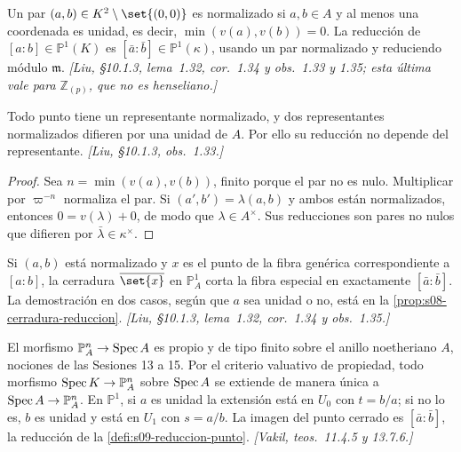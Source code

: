 \begin{defi}
\label{defi:s09-reduccion-punto}
Un par $(a,b)\in K^2\setminus\set{(0,0)}$ es normalizado si $a,b\in A$ y al menos una coordenada es unidad, es decir, $\min(v(a),v(b))=0$. La reducción de $[a:b]\in\mathbb P^1(K)$ es $[\bar a:\bar b]\in\mathbb P^1(\kappa)$, usando un par normalizado y reduciendo módulo $\mathfrak m$. \emph{[Liu, \S10.1.3, lema~1.32, cor.~1.34 y obs.~1.33 y 1.35; esta última vale para $\mathbb Z_{(p)}$, que no es henseliano.]}
\end{defi}

\begin{lema}
\label{lema:s09-reduccion-bien-definida}
Todo punto tiene un representante normalizado, y dos representantes normalizados difieren por una unidad de $A$. Por ello su reducción no depende del representante. \emph{[Liu, \S10.1.3, obs.~1.33.]}
\end{lema}
\begin{proof}
Sea $n=\min(v(a),v(b))$, finito porque el par no es nulo. Multiplicar por $\varpi^{-n}$ normaliza el par. Si $(a',b')=\lambda(a,b)$ y ambos están normalizados, entonces $0=v(\lambda)+0$, de modo que $\lambda\in A^\times$. Sus reducciones son pares no nulos que difieren por $\bar\lambda\in\kappa^\times$.
\end{proof}

\begin{prop}
\label{prop:s09-cerradura-reduccion}
Si $(a,b)$ está normalizado y $x$ es el punto de la fibra genérica correspondiente a $[a:b]$, la cerradura $\overline{\set{x}}$ en $\mathbb P^1_A$ corta la fibra especial en exactamente $[\bar a:\bar b]$. La demostración en dos casos, según que $a$ sea unidad o no, está en la \cref{prop:s08-cerradura-reduccion}. \emph{[Liu, \S10.1.3, lema~1.32, cor.~1.34 y obs.~1.35.]}
\end{prop}

\begin{obs}
\label{obs:s09-reduccion-propiedad}
El morfismo $\mathbb P^n_A\to\operatorname{Spec} A$ es propio y de tipo finito sobre el anillo noetheriano $A$, nociones de las Sesiones 13 a 15. Por el criterio valuativo de propiedad, todo morfismo $\operatorname{Spec} K\to\mathbb P^n_A$ sobre $\operatorname{Spec} A$ se extiende de manera única a $\operatorname{Spec} A\to\mathbb P^n_A$. En $\mathbb P^1$, si $a$ es unidad la extensión está en $U_0$ con $t=b/a$; si no lo es, $b$ es unidad y está en $U_1$ con $s=a/b$. La imagen del punto cerrado es $[\bar a:\bar b]$, la reducción de la \cref{defi:s09-reduccion-punto}. \emph{[Vakil, teos.~11.4.5 y 13.7.6.]}
\end{obs}

